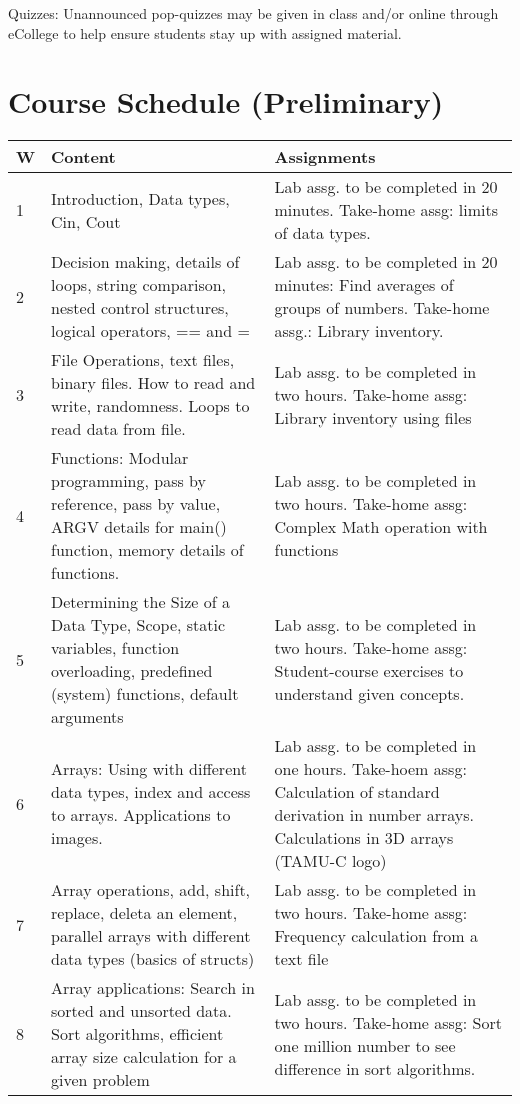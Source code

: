 \documentclass[11pt]{article}
\begin{document}
Quizzes: Unannounced pop-quizzes may be given in class and/or online
through eCollege to help ensure students stay up with assigned
material.


\section*{Course Schedule (Preliminary)}
\label{sec-11}

\tiny
\begin{center}
\begin{tabular}{|p{0.1in}|p{2.2in}|p{2.2in}|}
\hline
\textbf{W} & \textbf{Content} & \textbf{Assignments}\\
\hline
1 & Introduction, Data types, Cin, Cout & Lab assg. to be completed in 20 minutes. Take-home assg: limits of data types.\\
\hline
2 & Decision making, details of loops, string comparison, nested control structures, logical operators, == and = & Lab assg. to be completed in 20 minutes: Find averages of groups of numbers. Take-home assg.: Library inventory.\\
\hline
3 & File Operations, text files, binary files.  How to read and write, randomness.  Loops to read data from file. & Lab assg. to be completed in two hours. Take-home assg: Library inventory using files\\
\hline
4 & Functions: Modular programming, pass by reference, pass by value, ARGV details for main() function, memory details of functions. & Lab assg. to be completed in two hours. Take-home assg: Complex Math operation with functions\\
\hline
5 & Determining the Size of a Data Type, Scope, static variables, function overloading, predefined (system) functions, default arguments & Lab assg. to be completed in two hours. Take-home assg: Student-course exercises to understand given concepts.\\
\hline
6 & Arrays: Using with different data types, index and access to arrays.  Applications to images. & Lab assg. to be completed in one hours. Take-hoem assg: Calculation of standard derivation in number arrays.  Calculations in 3D arrays (TAMU-C logo)\\
\hline
7 & Array operations, add, shift, replace, deleta an element, parallel arrays with different data types (basics of structs) & Lab assg. to be completed in two hours. Take-home assg: Frequency calculation from a text file\\
\hline
8 & Array applications: Search in sorted and unsorted data.  Sort algorithms, efficient array size calculation for a given problem & Lab assg. to be completed in two hours. Take-home assg: Sort one million number to see difference in sort algorithms.\\

\end{tabular}
\end{center}
\end{document}
